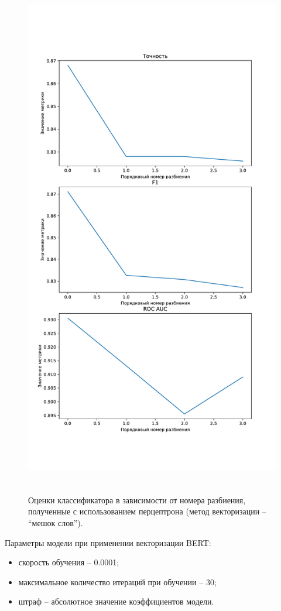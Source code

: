 \begin{figure}[H]
	\centering
	\includegraphics[height=23cm]{inc/plots/perceptronMetricsBag.pdf}
	\caption{ Оценки классификатора в зависимости от номера разбиения, полученные с использованием перцептрона (метод векторизации --  ``мешок слов''). }
	\label{img:perceptronMetricsBag}
\end{figure}


Параметры модели при применении векторизации BERT:
\begin{itemize}
	\item скорость обучения -- 0.0001;
	\item максимальное количество итераций при обучении -- 30;
	\item штраф -- абсолютное значение коэффициентов модели.
\end{itemize}

